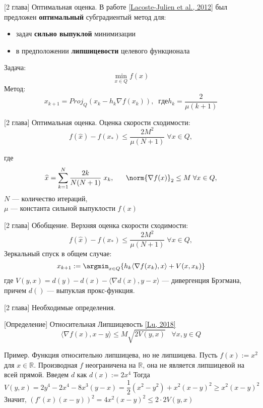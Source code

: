 \begin{frame}{[2 глава] Оптимальная оценка.}
    В работе \href{https://arxiv.org/abs/1212.2002}{[Lacoste-Julien et al., 2012]} был предложен \textbf{оптимальный} субградиентый метод для:
    \begin{itemize}
        \item задач \textbf{сильно выпуклой} минимизации
        \item в предположении \textbf{липшицевости} целевого функционала
    \end{itemize}
    Задача: $$\min_{x \in Q} f(x)$$
    Метод: $$ x_{k+1} = {Proj}_{Q}(x_k - h_k \nabla f(x_k) ), \; \; где h_k = \frac{2}{\mu (k+1)} $$
\end{frame}


\begin{frame}{[2 глава] Оптимальная оценка.}
    Оценка скорости сходимости: 
    $$
    \label{eq:1} f(\widehat{x}) - f(x_*) \leq \frac{2 M^2}{\mu (N+1)} \; \forall x \in Q,
    $$
    
    где $$\widehat{x} = \sum_{k=1}^{N} \frac{2 k}{N (N+1)} \; x_k,  \;\;\;\;\;\; \norm{\nabla f(x)}_{2} \leq M \; \forall x \in Q,$$
    $N$ --- количество итераций, \\
    $\mu$ --- константа сильной выпуклости $f(x)$ 
\end{frame}


\begin{frame}{[2 глава] Обобщение.}
    Верхняя оценка скорости сходимости: 
    $$
    f(\widehat{x}) - f(x_*) \leq \frac{2 M^2}{\mu (N+1)} \; \forall x \in Q,
    $$
    Зеркальный спуск в общем случае:
    $$
    x_{k+1} := \argmin_{x \in Q} \{ h_k \langle \nabla f(x_k), x\rangle + V(x, x_k)\} 
    $$
    где $V(y,x) = d(y) - d(x) - \langle \nabla d(x), y - x \rangle$ --- дивергенция Брэгмана, причем $d()$ --- выпуклая прокс-функция.
\end{frame}


\begin{frame}{[2 глава] Необходимые определения.}
    \begin{block}{[Определение] Относительная Липшицевость  \href{https://arxiv.org/pdf/1710.04718.pdf}{[Lu, 2018]}}
        $$
        \langle \nabla f(x), x - y \rangle \leq M\sqrt{2 V(y, x)} \;\;\; \forall x, y \in Q
        $$
    \end{block}

    \begin{exampleblock}{Пример. Функция относительно липшицева, но не липшицева.} 
        Пусть $f(x) := x^2$ для $x \in \mathbb{R}$. Производная $f$ неограничена на $\mathbb{R}$, она не является липшицевой на всей прямой. Введем $d$ как $d(x) := 2x^4$
        Тогда
        $$ V(y, x) = 2y^4 - 2x^4 - 8x^3 (y-x) = \frac{1}{2}(x^2 - y^2) + x^2 (x - y)^2 \geq x^2 (x - y)^2 $$
        Значит, $ (f'(x) (x - y))^2 = 4x^2 (x - y)^2 \leq 2 \cdot 2 V(y,x)$ \\
        \vspace{\baselineskip}
    \end{exampleblock}
\end{frame}


